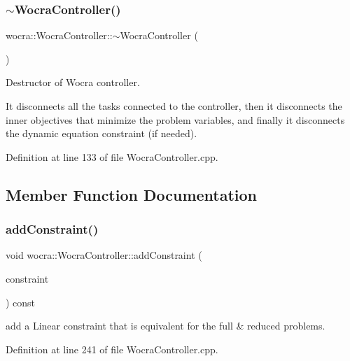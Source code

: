 \subsubsection{\texorpdfstring{$\sim$\+Wocra\+Controller()}{~WocraController()}}
{\footnotesize\ttfamily wocra\+::\+Wocra\+Controller\+::$\sim$\+Wocra\+Controller (\begin{DoxyParamCaption}{ }\end{DoxyParamCaption})\hspace{0.3cm}{\ttfamily [virtual]}}

Destructor of Wocra controller.

It disconnects all the tasks connected to the controller, then it disconnects the inner objectives that minimize the problem variables, and finally it disconnects the dynamic equation constraint (if needed). 

Definition at line 133 of file Wocra\+Controller.\+cpp.



\subsection{Member Function Documentation}
\hypertarget{classwocra_1_1WocraController_a45b43039b1d950ba59d569f24b6e265d}{}\label{classwocra_1_1WocraController_a45b43039b1d950ba59d569f24b6e265d} 
\subsubsection{\texorpdfstring{add\+Constraint()}{addConstraint()}\hspace{0.1cm}{\footnotesize\ttfamily [1/2]}}
{\footnotesize\ttfamily void wocra\+::\+Wocra\+Controller\+::add\+Constraint (\begin{DoxyParamCaption}\item[{\hyperlink{namespaceocra_ae8b87cf4099be3efc3b410019ad2046e}{ocra\+::\+Linear\+Constraint} \&}]{constraint }\end{DoxyParamCaption}) const}

add a Linear constraint that is equivalent for the full \& reduced problems. 

Definition at line 241 of file Wocra\+Controller.\+cpp.

\hypertarget{classwocra_1_1WocraController_af6db65f470668d19bb7fd24821f042db}{}\label{classwocra_1_1WocraController_af6db65f470668d19bb7fd24821f042db} 
